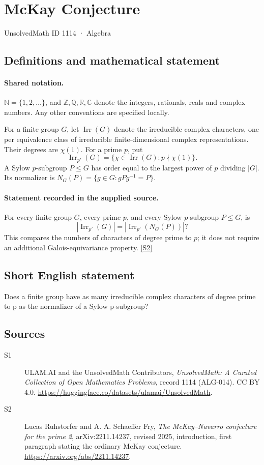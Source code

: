 \documentclass[11pt]{article}
\newcommand{\sref}[2]{\hyperlink{source:#1:#2}{[S#2]}}
\begin{document}
\setcounter{section}{1113}
\section{McKay Conjecture}\label{1114}
{\small\sffamily UnsolvedMath ID 1114 · Algebra}
\subsection{Definitions and mathematical statement}

\paragraph{Shared notation.}$\mathbb N=\{1,2,\ldots\}$, and $\mathbb Z,\mathbb Q,\mathbb R,\mathbb C$ denote the integers, rationals, reals and complex numbers. Any other conventions are specified locally.


For a finite group \(G\), let \(\operatorname{Irr}(G)\) denote the
irreducible complex characters, one per equivalence class of irreducible
finite-dimensional complex representations.  Their degrees are
\(\chi(1)\).  For a prime \(p\), put
\[
 \operatorname{Irr}_{p'}(G)
  =\{\chi\in\operatorname{Irr}(G):p\nmid\chi(1)\}.
\]
A Sylow \(p\)-subgroup \(P\le G\) has order equal to the largest power
of \(p\) dividing \(|G|\).  Its normalizer is
\(N_G(P)=\{g\in G:gPg^{-1}=P\}\).
\paragraph{Statement recorded in the supplied source.}
For every finite group \(G\), every prime \(p\), and every Sylow
\(p\)-subgroup \(P\le G\), is
\[
 |\operatorname{Irr}_{p'}(G)|
   =|\operatorname{Irr}_{p'}(N_G(P))|?
\]
This compares the numbers of characters of degree prime to \(p\);
it does not require an additional Galois-equivariance property. \sref{1114}{2}
\subsection{Short English statement}
Does a finite group have as many irreducible complex characters of degree prime to p as the normalizer of a Sylow p-subgroup?
\subsection{Sources}
\begin{description}
\item[\hypertarget{source:1114:1}{S1}] ULAM.AI and the UnsolvedMath Contributors, \emph{UnsolvedMath: A Curated Collection of Open Mathematics Problems}, record 1114 (ALG-014). CC BY 4.0. \url{https://huggingface.co/datasets/ulamai/UnsolvedMath}.
\item[\hypertarget{source:1114:2}{S2}] Lucas Ruhstorfer and A. A. Schaeffer Fry, \emph{The McKay--Navarro conjecture for the prime 2}, arXiv:2211.14237, revised 2025, introduction, first paragraph stating the ordinary McKay conjecture. \url{https://arxiv.org/abs/2211.14237}.
\end{description}
\label{end:1114}
\end{document}

